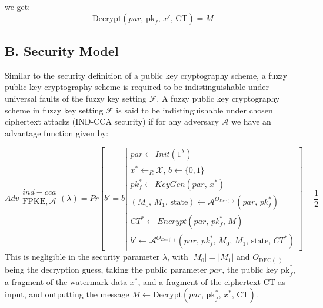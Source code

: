 \documentclass[graybox]{svmult}
\begin{document}
we get:
\[
    \text{Decrypt}(par ,\, \text{pk}_f,\, x',\, \text{CT}) = M
\]

\subsection*{B. Security Model}

Similar to the security definition of a public key cryptography scheme, a fuzzy public key cryptography scheme is required to be indistinguishable under universal faults of the fuzzy key setting \( \mathcal{F} \).
A fuzzy public key cryptography scheme in fuzzy key setting \( \mathcal{F} \) is said to be indistinguishable under chosen ciphertext attacks (IND-CCA security) if for any adversary \( \mathcal{A} \) we have an advantage function given by:

\begin{equation*}
    Adv\begin{array}{c}
        ind-cca                  \\
        \text{FPKE}, \mathcal{A} \\
    \end{array} (\lambda)
    =
    Pr\left[b'= b \left| \begin{array}{c}
            par  \leftarrow Init(1^\lambda)                                                         \\
            x^* \leftarrow_{R} \mathcal{X}, \, b \leftarrow \{0, 1 \}                               \\
            pk^*_f \leftarrow KeyGen(par , \, x^*)                                                  \\

            (M_{0}, \, M_{1}, \, \text{state}) \leftarrow \mathcal{A}^{O_{Dec(.)}}(par , \, pk^*_f) \\
            CT^* \leftarrow Encrypt(par , \, pk^*_f, \, M)                                          \\
            b' \leftarrow \mathcal{A}^{O_{Dec(.)}}(par  , \, pk^*_f, \, M_0, \, M_1, \, \text{state}, \, CT^*)
        \end{array} \right. \right] - \frac{1}{2}
\end{equation*}
This is negligible in the security parameter \( \lambda \), with \( |M_0| = |M_1| \) and \( O_{\text{DEC}(.)} \) \allowbreak being the decryption guess, taking the public parameter \(  par \), the public key \( \text{pk}_f^* \), a \allowbreak fragment of the watermark data \( x^* \), and a fragment of the ciphertext \( \text{CT} \) as input, and \allowbreak outputting the message \( M \leftarrow \text{Decrypt}(par ,\, \text{pk}_f^*,\, x^*,\, \text{CT}) \).
\end{document}
